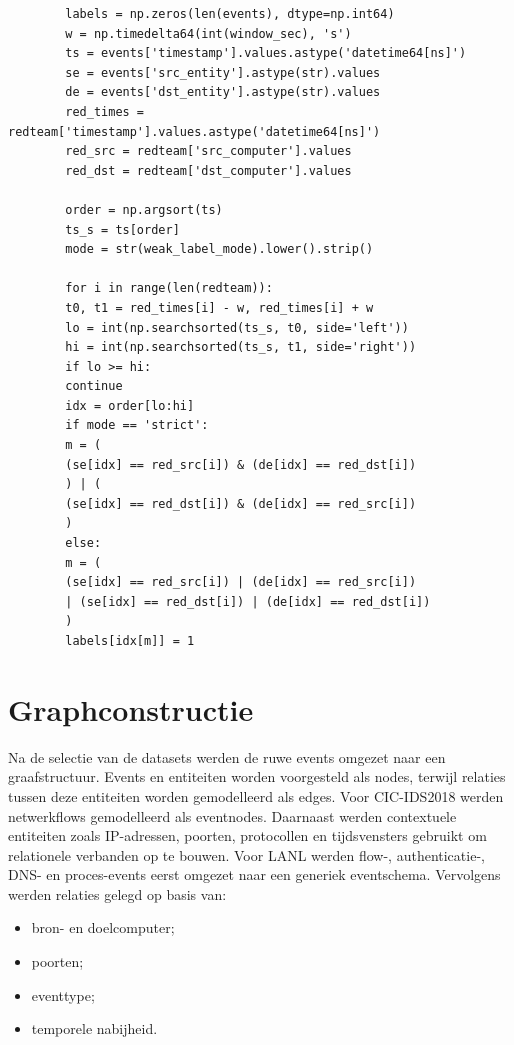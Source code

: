 \begin{listing}[H]
    \caption{Weak-label toekenning binnen \texttt{map\_lanl\_to\_generic\_schema}.}
    \begin{verbatim}
        labels = np.zeros(len(events), dtype=np.int64)
        w = np.timedelta64(int(window_sec), 's')
        ts = events['timestamp'].values.astype('datetime64[ns]')
        se = events['src_entity'].astype(str).values
        de = events['dst_entity'].astype(str).values
        red_times = redteam['timestamp'].values.astype('datetime64[ns]')
        red_src = redteam['src_computer'].values
        red_dst = redteam['dst_computer'].values
        
        order = np.argsort(ts)
        ts_s = ts[order]
        mode = str(weak_label_mode).lower().strip()
        
        for i in range(len(redteam)):
        t0, t1 = red_times[i] - w, red_times[i] + w
        lo = int(np.searchsorted(ts_s, t0, side='left'))
        hi = int(np.searchsorted(ts_s, t1, side='right'))
        if lo >= hi:
        continue
        idx = order[lo:hi]
        if mode == 'strict':
        m = (
        (se[idx] == red_src[i]) & (de[idx] == red_dst[i])
        ) | (
        (se[idx] == red_dst[i]) & (de[idx] == red_src[i])
        )
        else:
        m = (
        (se[idx] == red_src[i]) | (de[idx] == red_src[i])
        | (se[idx] == red_dst[i]) | (de[idx] == red_dst[i])
        )
        labels[idx[m]] = 1
    \end{verbatim}
\end{listing}
    

\section{Graphconstructie}

Na de selectie van de datasets werden de ruwe events omgezet naar een graafstructuur.
\newline
\newline
Events en entiteiten worden voorgesteld als nodes, terwijl relaties tussen deze entiteiten worden gemodelleerd als edges.
\newline
\newline
Voor CIC-IDS2018 werden netwerkflows gemodelleerd als eventnodes. Daarnaast werden contextuele entiteiten zoals IP-adressen, poorten, protocollen en tijdsvensters gebruikt om relationele verbanden op te bouwen.
\newline
\newline
Voor LANL werden flow-, authenticatie-, DNS- en proces-events eerst omgezet naar een generiek eventschema. Vervolgens werden relaties gelegd op basis van:
\begin{itemize}
    \item bron- en doelcomputer;
    \item poorten;
    \item eventtype;
    \item temporele nabijheid.
\end{itemize}

